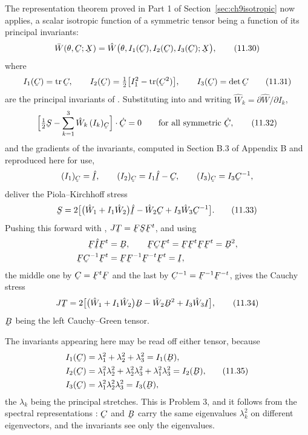 The representation theorem proved in Part 1 of
Section~\ref{sec:ch9isotropic} now applies, a scalar isotropic function
of a symmetric tensor being a function of its principal invariants:
\begin{equation}
   \bar W(\theta,\bC;\bX)
   =\hat W\big(\theta,I_{1}(\bC),I_{2}(\bC),I_{3}(\bC);\bX\big),
   \tag{11.30}\label{eq:11.30}
\end{equation}
where
\begin{equation}
   I_{1}(\bC)=\tr\bC,\qquad
   I_{2}(\bC)=\tfrac12\big[I^{2}_{1}-\tr(\bC^{2})\big],\qquad
   I_{3}(\bC)=\det\bC
   \tag{11.31}\label{eq:11.31}
\end{equation}
are the principal invariants of . Substituting into
 and writing $\hat W_{k}=\partial\hat W/\partial I_{k}$,
\begin{equation}
   \Big[\tfrac12\bS-\sum^{3}_{k=1}\hat W_{k}\,(I_{k})_{\bC}\Big]
   \cdot\dot\bC=0\qquad\text{for all symmetric }\dot\bC ,
   \tag{11.32}\label{eq:11.32}
\end{equation}
and the gradients of the invariants, computed in Section B.3 of
Appendix B and reproduced here for use,
\[
   (I_{1})_{\bC}=\hI,\qquad
   (I_{2})_{\bC}=I_{1}\hI-\bC,\qquad
   (I_{3})_{\bC}=I_{3}\bC^{-1},
\]
deliver the Piola--Kirchhoff stress
\begin{equation}
   \bS=2\big[\big(\hat W_{1}+I_{1}\hat W_{2}\big)\hI
   -\hat W_{2}\bC+I_{3}\hat W_{3}\bC^{-1}\big].
   \tag{11.33}\label{eq:11.33}
\end{equation}
Pushing this forward with , $J\bT=\bF\bS\bF^{t}$, and using
\[
\begin{aligned}
   \bF\hI\bF^{t}&=\bB,\qquad
   \bF\bC\bF^{t}=\bF\bF^{t}\bF\bF^{t}=\bB^{2},\\
   \bF\bC^{-1}\bF^{t}&=\bF\bF^{-1}\bF^{-t}\bF^{t}=\I ,
\end{aligned}
\]
the middle one by $\bC=\bF^{t}\bF$ and the last by
$\bC^{-1}=\bF^{-1}\bF^{-t}$, gives the Cauchy stress
\begin{equation}
   J\bT=2\big[\big(\hat W_{1}+I_{1}\hat W_{2}\big)\bB
   -\hat W_{2}\bB^{2}+I_{3}\hat W_{3}\I\big],
   \tag{11.34}\label{eq:11.34}
\end{equation}
$\bB$ being the left Cauchy--Green tensor.

The invariants appearing here may be read off either tensor, because
\begin{equation}
\begin{aligned}
   I_{1}(\bC)&=\lambda^{2}_{1}+\lambda^{2}_{2}+\lambda^{2}_{3}
   =I_{1}(\bB),\\
   I_{2}(\bC)&=\lambda^{2}_{1}\lambda^{2}_{2}
   +\lambda^{2}_{2}\lambda^{2}_{3}+\lambda^{2}_{1}\lambda^{2}_{3}
   =I_{2}(\bB),\\
   I_{3}(\bC)&=\lambda^{2}_{1}\lambda^{2}_{2}\lambda^{2}_{3}=I_{3}(\bB),
\end{aligned}
   \tag{11.35}\label{eq:11.35}
\end{equation}
the $\lambda_{k}$ being the principal stretches. This is Problem 3, and
it follows from the spectral representations : $\bC$ and $\bB$
carry the same eigenvalues $\lambda^{2}_{k}$ on different eigenvectors,
and the invariants see only the eigenvalues.


